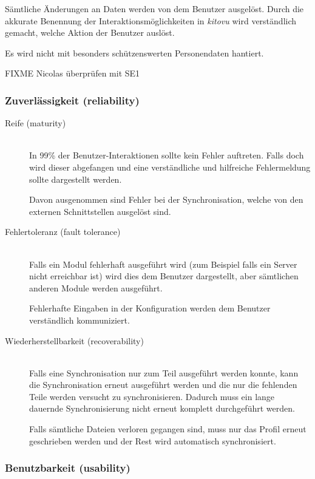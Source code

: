\documentclass[a4paper]{article}
\begin{document}
\begin{description}
    Sämtliche Änderungen an Daten werden von dem Benutzer ausgelöst. Durch die akkurate Benennung der Interaktionsmöglichkeiten in \emph{kitovu} wird verständlich gemacht, welche Aktion der Benutzer auslöst.

    Es wird nicht mit besonders schützenswerten Personendaten hantiert.
\end{description}

FIXME Nicolas überprüfen mit SE1

\subsubsection{Zuverlässigkeit (reliability)}

\begin{description}
  \item[Reife (maturity)] \strut \\
    In 99\% der Benutzer-Interaktionen sollte kein Fehler auftreten.
    Falls doch wird dieser abgefangen und eine verständliche und hilfreiche Fehlermeldung sollte dargestellt werden.

    Davon ausgenommen sind Fehler bei der Synchronisation, welche von den externen Schnittstellen ausgelöst sind.
  \item[Fehlertoleranz (fault tolerance)] \strut \\
    Falls ein Modul fehlerhaft ausgeführt wird (zum Beispiel falls ein Server nicht erreichbar ist) wird dies dem Benutzer dargestellt, aber sämtlichen anderen Module werden ausgeführt.

    Fehlerhafte Eingaben in der Konfiguration werden dem Benutzer verständlich kommuniziert.
  \item[Wiederherstellbarkeit (recoverability)] \strut \\
    Falls eine Synchronisation nur zum Teil ausgeführt werden konnte, kann die Synchronisation erneut ausgeführt werden und die nur die fehlenden Teile werden versucht zu synchronisieren.
    Dadurch muss ein lange dauernde Synchronisierung nicht erneut komplett durchgeführt werden.

    Falls sämtliche Dateien verloren gegangen sind, muss nur das Profil erneut geschrieben werden und der Rest wird automatisch synchronisiert.
\end{description}

\subsubsection{Benutzbarkeit (usability)}
\end{document}
